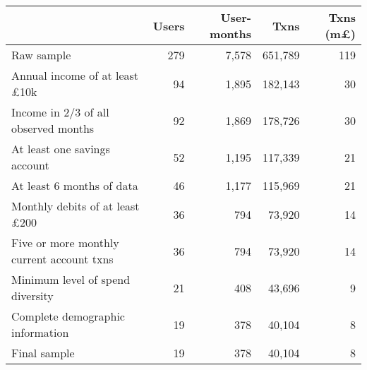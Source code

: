 \begin{tabular}{lrrrr}
\toprule
                                          & Users & User-months &    Txns & Txns (m\pounds) \\
\midrule
                               Raw sample &   279 &       7,578 & 651,789 &             119 \\
     Annual income of at least \pounds10k &    94 &       1,895 & 182,143 &              30 \\
     Income in 2/3 of all observed months &    92 &       1,869 & 178,726 &              30 \\
             At least one savings account &    52 &       1,195 & 117,339 &              21 \\
                At least 6 months of data &    46 &       1,177 & 115,969 &              21 \\
    Monthly debits of at least \pounds200 &    36 &         794 &  73,920 &              14 \\
Five or more monthly current account txns &    36 &         794 &  73,920 &              14 \\
         Minimum level of spend diversity &    21 &         408 &  43,696 &               9 \\
         Complete demographic information &    19 &         378 &  40,104 &               8 \\
                             Final sample &    19 &         378 &  40,104 &               8 \\
\bottomrule
\end{tabular}
